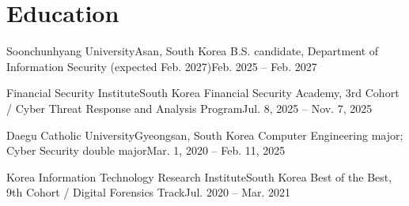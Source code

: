 \section{Education}
  \resumeSubHeadingListStart
    \resumeSubheading
      {Soonchunhyang University}{Asan, South Korea}
      {B.S. candidate, Department of Information Security (expected Feb. 2027)}{Feb. 2025 -- Feb. 2027}
      \resumeItemListStart
      \resumeItemListEnd

    \resumeSubheading
      {Financial Security Institute}{South Korea}
      {Financial Security Academy, 3rd Cohort / Cyber Threat Response and Analysis Program}{Jul. 8, 2025 -- Nov. 7, 2025}

    \resumeSubheading
      {Daegu Catholic University}{Gyeongsan, South Korea}
      {Computer Engineering major; Cyber Security double major}{Mar. 1, 2020 -- Feb. 11, 2025}
      \resumeItemListStart
      \resumeItemListEnd

    \resumeSubheading
      {Korea Information Technology Research Institute}{South Korea}
      {Best of the Best, 9th Cohort / Digital Forensics Track}{Jul. 2020 -- Mar. 2021}
  \resumeSubHeadingListEnd
